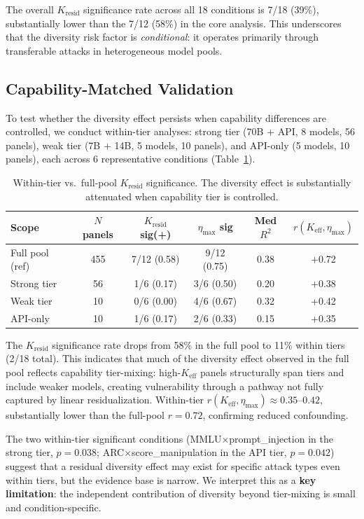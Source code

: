 \documentclass[11pt,a4paper]{article}
\newcommand{\keff}{K_{\text{eff}}}
\newcommand{\etamax}{\eta_{\max}}
\newcommand{\kresid}{K_{\text{resid}}}
\begin{document}
The overall $\kresid$ significance rate across all 18 conditions is 7/18 (39\%), substantially lower than the 7/12 (58\%) in the core analysis. This underscores that the diversity risk factor is \emph{conditional}: it operates primarily through transferable attacks in heterogeneous model pools.

\subsection{Capability-Matched Validation}
\label{sec:capability_matched}

To test whether the diversity effect persists when capability differences are controlled, we conduct within-tier analyses: strong tier (70B $+$ API, 8 models, 56 panels), weak tier (7B $+$ 14B, 5 models, 10 panels), and API-only (5 models, 10 panels), each across 6 representative conditions (Table~\ref{tab:within_tier}).

\begin{table}[t]
\centering
\caption{Within-tier vs.\ full-pool $\kresid$ significance. The diversity effect is substantially attenuated when capability tier is controlled.}
\label{tab:within_tier}
\small
\begin{tabular}{@{}lccccc@{}}
\toprule
Scope & $N$ panels & $\kresid$ sig(+) & $\etamax$ sig & Med $R^2$ & $r(\keff, \etamax)$ \\
\midrule
Full pool (ref) & 455 & 7/12 (0.58) & 9/12 (0.75) & 0.38 & +0.72 \\
Strong tier & 56 & 1/6 (0.17) & 3/6 (0.50) & 0.20 & +0.38 \\
Weak tier & 10 & 0/6 (0.00) & 4/6 (0.67) & 0.32 & +0.42 \\
API-only & 10 & 1/6 (0.17) & 2/6 (0.33) & 0.15 & +0.35 \\
\bottomrule
\end{tabular}
\end{table}

The $\kresid$ significance rate drops from 58\% in the full pool to 11\% within tiers (2/18 total). This indicates that much of the diversity effect observed in the full pool reflects capability tier-mixing: high-$\keff$ panels structurally span tiers and include weaker models, creating vulnerability through a pathway not fully captured by linear residualization. Within-tier $r(\keff, \etamax) \approx 0.35$--$0.42$, substantially lower than the full-pool $r = 0.72$, confirming reduced confounding.

The two within-tier significant conditions (MMLU$\times$prompt\_injection in the strong tier, $p = 0.038$; ARC$\times$score\_manipulation in the API tier, $p = 0.042$) suggest that a residual diversity effect may exist for specific attack types even within tiers, but the evidence base is narrow. We interpret this as a \textbf{key limitation}: the independent contribution of diversity beyond tier-mixing is small and condition-specific.
\end{document}
